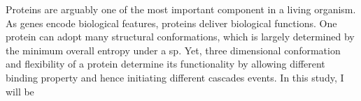 Proteins are arguably one of the most important component in a living organism. As genes encode biological features, proteins deliver biological functions. One protein can adopt many structural conformations, which is largely determined by the minimum overall entropy under a sp. Yet, three dimensional conformation and flexibility of a protein determine its functionality by allowing different binding property and hence initiating different cascades events. In this study, I will be 